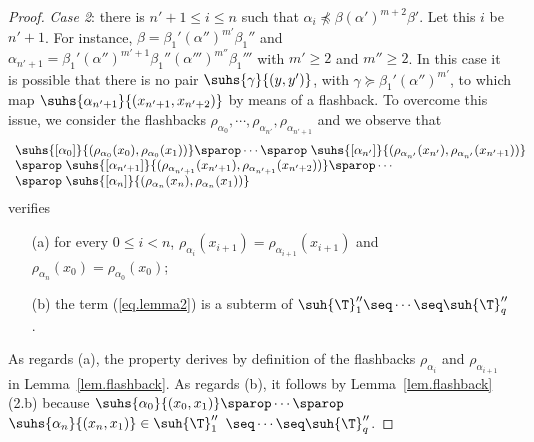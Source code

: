\begin{proof}
\emph{Case 2}: there is $n'+1 \leq i \leq n$ such that $\alpha_i \not \preceq \beta (\alpha')^{m+2}\beta'$. Let this $i$ be $n'+1$. For instance, 
$\beta = \beta_1' (\alpha'')^{m'} \beta_1''$ and $\alpha_{n'+1} = \beta_1'(\alpha'')^{m'+1} \beta_1''(\alpha''')^{m''} \beta_1'''$ with $m' \geq 2$ and $m'' \geq 2$.
In this case it is possible that there is no pair $\suhs{\gamma}{(y, 
y')}$, with $\gamma \succeq  \beta_1' (\alpha'')^{m'}$, to which map 
$\suhs{\alpha_{n'+1}}{(x_{n'+1}, x_{n'+2})}$ by means of a flashback.
To overcome 
this issue, we consider the flashbacks
$\rho_{\alpha_0}, \cdots , \rho_{\alpha_{n'}}, \rho_{\alpha_{n'+1}}$ and we observe 
that
\begin{eqnarray}
\label{eq.lemma2}
\begin{array}{l}
\suhs{[\alpha_0]}{(\rho_{\alpha_0}(x_0), 
\rho_{\alpha_0}(x_{1}))} \sparop  \cdots  
\sparop \;
\suhs{[\alpha_{n'}]}{
(\rho_{\alpha_{n'}}(x_{n'}), 
\rho_{\alpha_{n'}}(x_{n'+1}))} \hspace{-.6cm}
\\
\sparop \; \suhs{[\alpha_{n'+1}]}{
(\rho_{\alpha_{n'+1}}(x_{n'+1}), 
\rho_{\alpha_{n'+1}}(x_{n'+2}))} \sparop \cdots 
\\
\sparop \; \suhs{[\alpha_{n}]}{(\rho_{\alpha_{n}}(x_{n}), 
\rho_{\alpha_{n}}(x_{1}))}
\end{array}
\end{eqnarray}
verifies
\begin{enumerate}
\item[(a)]
for every $0 \leq i < n$, $\rho_{\alpha_i}(x_{i+1}) = 
\rho_{\alpha_{i+1}}(x_{i+1})$ and $\rho_{\alpha_n}(x_{0}) = 
\rho_{\alpha_{0}}(x_{0})$;
\item[(b)]
the term (\ref{eq.lemma2}) is a subterm of $ \suh{\T}_1''\seq\cdots\seq\suh{\T}_q''$.
\end{enumerate}
As regards (a), the property derives by definition of the flashbacks $\rho_{\alpha_i}$
and $\rho_{\alpha_{i+1}}$ in Lemma~\ref{lem.flashback}.
As regards (b), it follows by Lemma~\ref{lem.flashback}(2.b) because 
$\suhs{\alpha_0}{(x_0,x_1)} \sparop \cdots \sparop$
$\suhs{\alpha_{n}}{(x_{n},x_{1})} \in \suh{\T}_1''$ $\seq\cdots\seq\suh{\T}_q''$.
\end{proof}

